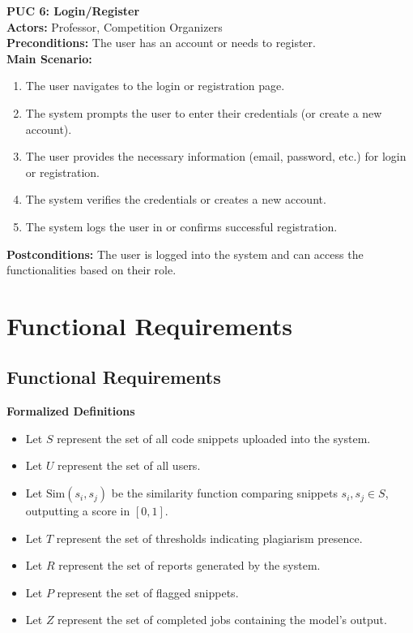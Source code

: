 \documentclass[12pt]{article}
\begin{document}
\textbf{PUC 6: Login/Register}\\
\textbf{Actors:} Professor, Competition Organizers\\
\textbf{Preconditions:} The user has an account or needs to register.\\
\textbf{Main Scenario:}
\begin{enumerate}
    \item The user navigates to the login or registration page.
    \item The system prompts the user to enter their credentials (or create a new account).
    \item The user provides the necessary information (email, password, etc.) for login or registration.
    \item The system verifies the credentials or creates a new account.
    \item The system logs the user in or confirms successful registration.
\end{enumerate}
\textbf{Postconditions:} The user is logged into the system and can access the functionalities based on their role.

\section{Functional Requirements}
\subsection{Functional Requirements}

\textbf{Formalized Definitions}
\begin{itemize}
    \item Let \( S \) represent the set of all code snippets uploaded into the system.
    \item Let \( U \) represent the set of all users.
    \item Let \( \text{Sim}(s_i, s_j) \) be the similarity function comparing snippets \( s_i, s_j \in S \), outputting a score in \( [0, 1] \).
    \item Let \( T \) represent the set of thresholds indicating plagiarism presence.
    \item Let \( R \) represent the set of reports generated by the system.
    \item Let \( P \) represent the set of flagged snippets.
    \item Let \( Z \) represent the set of completed jobs containing the model's output.
\end{itemize}
\end{document}
